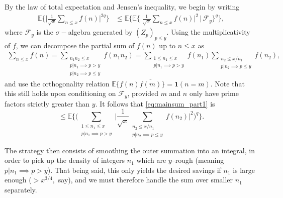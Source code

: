 \documentclass{amsart}
\theoremstyle{definition}
\theoremstyle{remark}
\numberwithin{equation}{section}
\begin{document}
By the law of total expectation and Jensen's inequality, we begin by writing
\begin{align}\label{eq:mainsum_part1}
    \mathbb{E}\bigg\{\bigg|\frac{1}{\sqrt{x}}\sum_{n\leq x}f(n)\bigg|^{2q}\bigg\} &\leq \mathbb{E}\Bigg\{\mathbb{E}\bigg\{\bigg|\frac{1}{\sqrt{x}}\sum_{n\leq x}f(n)\bigg|^{2}\,\bigg|\,\mathcal{F}_y\bigg\}^q \Bigg\},
\end{align}
where $\mathcal{F}_y$ is the  $\sigma-$algebra generated by $(Z_p)_{p\leq y}$.
Using the multiplicativity of $f$, we can decompose the partial sum of $f(n)$ up to $n\leq x$ as
\begin{align*}
    \sum_{n\leq x}f(n)=\sum_{\substack{n_1n_2\leq x\\ p|n_1 \implies p>y\\p|n_2\implies p\leq y}}f(n_1n_2)=\sum_{\substack{1\leq n_1\leq x\\p|n_1\implies p>y}} f(n_1)\sum_{\substack{n_2\leq x/n_1\\ p|n_2\implies p\leq y}} f(n_2),
\end{align*}
and use the orthogonality relation $\mathbb{E}\big\{f(n)\overline{f(m)}\big\} = \mathbf{1}(n=m)$. Note that this still holds upon conditioning on $\mathcal{F}_y$, provided $m$ and $n$ only have prime factors strictly greater than $y$. It follows that \eqref{eq:mainsum_part1} is
\begin{equation}\label{eq:mainsum_part2}
         \leq \mathbb{E}\Bigg\{\Bigg(\sum_{\substack{1\leq n_1\leq x\\p|n_1\implies p>y}} \Bigg|\frac{1}{\sqrt{x}}\sum_{\substack{n_2\leq x/n_1\\ p|n_2\implies p\leq y}} f(n_2)\Bigg|^{2}\Bigg)^q\Bigg\}.
\end{equation}

The strategy then consists of smoothing the outer summation into an integral, in order to pick up the density of integers $n_1$ which are $y$--rough (meaning $p|n_1\!\!\implies\!\! p>y$). That being said, this only yields the desired savings if $n_1$ is large enough ($> x^{3/4},$ say), and we must therefore handle the sum over smaller $n_1$ separately. 
\end{document}

